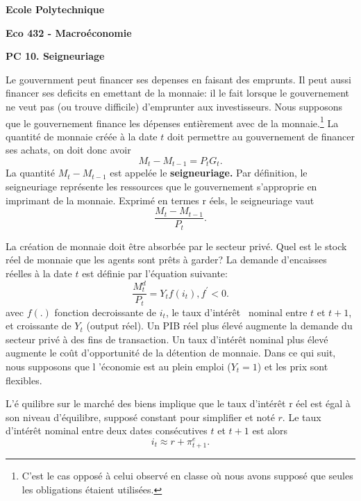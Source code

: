 \documentclass[a4paper,11pt]{article}
\begin{document}
\begin{center}
\textbf{Ecole Polytechnique}

\bigskip

\textbf{Eco 432 - Macro\'{e}conomie}

\bigskip

\textbf{PC 10. Seigneuriage}
\end{center}

\bigskip



Le gouvernment peut financer ses depenses en faisant des emprunts. Il peut aussi financer ses deficits en emettant de la monnaie: il le fait lorsque le gouvernement ne veut pas (ou trouve difficile) d'emprunter aux investisseurs. Nous supposons que le gouvernement finance les dépenses entièrement avec de la monnaie.\footnote {C'est le cas opposé à celui observé en classe où nous avons supposé que seules les obligations étaient utilisées.} La quantit\'{e}
de monnaie cr\'{e}\'{e}e \`{a} la date $t$ doit permettre au gouvernement de
financer ses achats, on doit donc avoir%
\begin{equation}
M_{t}-M_{t-1}=P_{t}G_t.  \label{uqE73}
\end{equation}
La quantit\'{e} $M_{t}-M_{t-1}$ est appel\'{e}e le \textbf{seigneuriage. }%
Par d\'{e}finition, le seigneuriage repr\'{e}sente les ressources que le
gouvernement s'approprie en imprimant de la monnaie. Exprim\'{e} en termes r%
\'{e}els, le seigneuriage vaut 
\begin{equation}
\frac{M_{t}-M_{t-1}}{P_{t}}.  \label{E78}
\end{equation}

La création de monnaie doit être absorbée par le secteur privé. Quel est le stock r\'{e}el de monnaie que les agents sont prêts à garder? La demande d'encaisses r\'{e}elles \`{a} la date $t$ est d\'{e}finie par l'\'{e}quation
suivante:%
\begin{equation}
\frac{M^d_{t}}{P_{t}}=Y_tf(i_{t}),f^{\prime }<0.  \label{E75}
\end{equation}
avec $f(.)$  fonction decroissante de $i_t$, le taux d'intérêt  nominal entre $t$ et $t+1$, et croissante de $Y_t$ (output r\'{e}el). Un PIB réel plus élevé augmente la demande du secteur privé à des fins de transaction. Un taux d'intérêt nominal plus élevé augmente le coût d'opportunité de la détention de monnaie. Dans ce qui suit, nous supposons que l '\'{e}conomie est au plein emploi ($ Y_t = 1 $) et les prix sont flexibles.

 L'\'{e}%
quilibre sur le march\'{e} des biens implique que le taux d'int\'{e}r\^{e}t r%
\'{e}el est \'{e}gal \`{a} son niveau d'\'{e}quilibre, suppos\'{e} constant
pour simplifier et not\'{e} $r.$  Le taux d'int\'{e}r\^{e}t nominal entre
deux dates cons\'{e}cutives $t$ et $t+1$ est alors%
\begin{equation}
i_{t}\approx r+\pi _{t+1}^{e}.  \label{E74}
\end{equation}
\end{document}

